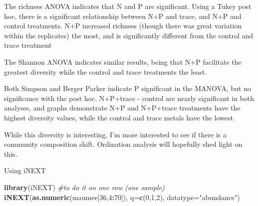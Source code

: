 \documentclass[]{article}
\newenvironment{Shaded}{\begin{snugshade}}{\end{snugshade}}
\newcommand{\KeywordTok}[1]{\textcolor[rgb]{0.13,0.29,0.53}{\textbf{#1}}}
\newcommand{\DataTypeTok}[1]{\textcolor[rgb]{0.13,0.29,0.53}{#1}}
\newcommand{\DecValTok}[1]{\textcolor[rgb]{0.00,0.00,0.81}{#1}}
\newcommand{\StringTok}[1]{\textcolor[rgb]{0.31,0.60,0.02}{#1}}
\newcommand{\CommentTok}[1]{\textcolor[rgb]{0.56,0.35,0.01}{\textit{#1}}}
\newcommand{\OperatorTok}[1]{\textcolor[rgb]{0.81,0.36,0.00}{\textbf{#1}}}
\newcommand{\NormalTok}[1]{#1}
\begin{document}
The richness ANOVA indicates that N and P are significant. Using a Tukey
post hoc, there is a significant relationship between N+P and trace, and
N+P and control treatments. N+P increased richness (though there was
great variation within the replicates) the most, and is significantly
different from the control and trace treatment

The Shannon ANOVA indicates similar results, being that N+P facilitate
the greatest diversity while the control and trace treatments the least.

Both Simpson and Berger Parker indicate P significant in the MANOVA, but
no significance with the post hoc. N+P+trace - control are nearly
significant in both analyses, and graphs demonstrate N+P and N+P+trace
treatments have the highest diversity values, while the control and
trace metals have the lowest.

While this diversity is interesting, I'm more interested to see if there
is a community composition shift. Ordination analysis will hopefully
shed light on this.

Using iNEXT

\begin{Shaded}
\begin{Highlighting}[]
\KeywordTok{library}\NormalTok{(iNEXT)}
\CommentTok{#to do it on one row (one sample)}
\KeywordTok{iNEXT}\NormalTok{(}\KeywordTok{as.numeric}\NormalTok{(maumee[}\DecValTok{36}\NormalTok{,}\DecValTok{4}\OperatorTok{:}\DecValTok{70}\NormalTok{]), }\DataTypeTok{q=}\KeywordTok{c}\NormalTok{(}\DecValTok{0}\NormalTok{,}\DecValTok{1}\NormalTok{,}\DecValTok{2}\NormalTok{), }\DataTypeTok{datatype=}\StringTok{"abundance"}\NormalTok{)}
\end{Highlighting}
\end{Shaded}
\end{document}
